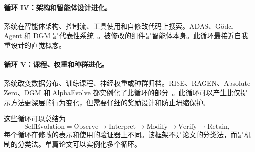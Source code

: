 \paragraph{循环 IV：架构和智能体设计进化。} 系统在智能体架构、控制流、工具使用和自修改代码上搜索。ADAS、G\"{o}del Agent 和 DGM 是代表性系统~\citep{adas2025,godelagent2024,darwingodelmachine2025}。被修改的组件是智能体本身。此循环最接近自我重设计的直觉概念。

\paragraph{循环 V：课程、权重和种群进化。} 系统改变数据分布、训练课程、神经权重或种群归档。RISE、RAGEN、Absolute Zero、DGM 和 AlphaEvolve 都实例化了此循环的部分~\citep{rise2024,ragen2025,absolutezero2025,darwingodelmachine2025,alphaevolve2025}。此循环可以产生比仅提示方法更深层的行为变化，但需要仔细的奖励设计和防止坍缩保护。

这些循环可以总结为
\begin{equation}
\mathrm{SelfEvolution} = \mathrm{Observe} \rightarrow \mathrm{Interpret} \rightarrow \mathrm{Modify} \rightarrow \mathrm{Verify} \rightarrow \mathrm{Retain},
\end{equation}
每个循环在修改的表示和使用的验证器上不同。该框架不是论文的分类法，而是机制的分类法。单篇论文可以实例化多个循环。

\begin{table}[htbp]
\centering
{}
\caption{本综述贯穿使用的五大进化循环框架。循环分类机制而非互斥系统。}
\label{tab:five-loops}
\end{table}

